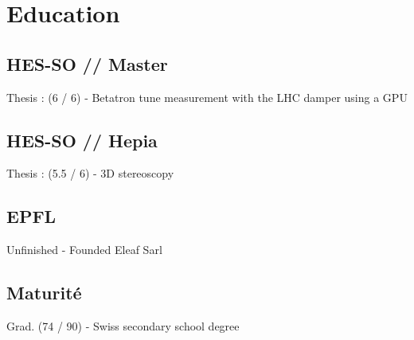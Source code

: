 \documentclass[a4paper]{deedy-resume} %
\begin{document}
\begin{minipage}[t]{0.33\textwidth} %


\section{Education}


\subsection{HES-SO // Master}
	Thesis : (6 / 6) - Betatron tune measurement with the LHC damper using a GPU \\

\sectionspace %


\subsection{HES-SO // Hepia}
	Thesis : (5.5 / 6) - 3D stereoscopy \\

\sectionspace %


\subsection{EPFL}
	Unfinished - Founded Eleaf Sarl \\

\sectionspace


\subsection{Maturité}
	Grad. (74 / 90) - Swiss secondary school degree \\


\end{minipage}
\end{document}
